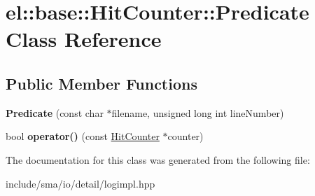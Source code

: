 \hypertarget{classel_1_1base_1_1HitCounter_1_1Predicate}{\section{el\-:\-:base\-:\-:Hit\-Counter\-:\-:Predicate Class Reference}
\label{classel_1_1base_1_1HitCounter_1_1Predicate}
}
\subsection*{Public Member Functions}
\begin{DoxyCompactItemize}
\item 
\hypertarget{classel_1_1base_1_1HitCounter_1_1Predicate_ab35f4f7da40df5a788c3984d097bb38c}{{\bfseries Predicate} (const char $\ast$filename, unsigned long int line\-Number)}\label{classel_1_1base_1_1HitCounter_1_1Predicate_ab35f4f7da40df5a788c3984d097bb38c}

\item 
\hypertarget{classel_1_1base_1_1HitCounter_1_1Predicate_ae07b1562a3c0ed38457401e60b80b0c5}{bool {\bfseries operator()} (const \hyperlink{classel_1_1base_1_1HitCounter}{Hit\-Counter} $\ast$counter)}\label{classel_1_1base_1_1HitCounter_1_1Predicate_ae07b1562a3c0ed38457401e60b80b0c5}

\end{DoxyCompactItemize}


The documentation for this class was generated from the following file\-:\begin{DoxyCompactItemize}
\item 
include/sma/io/detail/logimpl.\-hpp\end{DoxyCompactItemize}
